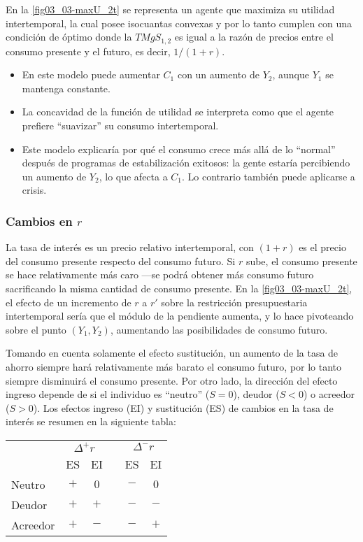 \documentclass[DeGregorioResumen]{subfiles}
\begin{document}
En la \autoref{fig03_03-maxU_2t} se representa un agente que maximiza su utilidad intertemporal, la cual posee isocuantas convexas y por lo tanto cumplen con una condición de óptimo donde la $TMgS_{1,2}$ es igual a la razón de precios entre el consumo presente y el futuro, es decir, $1/(1+r)$.

\begin{itemize}
\item En este modelo puede aumentar $C_1$ con un aumento de $Y_2$, aunque $Y_1$ se mantenga constante.
\item La concavidad de la función de utilidad se interpreta como que el agente prefiere ``suavizar'' su consumo intertemporal.
\item Este modelo explicaría por qué el consumo crece más allá de lo ``normal'' después de programas de estabilización exitosos: la gente estaría percibiendo un aumento de $Y_2$, lo que afecta a $C_1$. Lo contrario también puede aplicarse a crisis.
\end{itemize}



\subsubsection{Cambios en $r$}

La tasa de interés es un precio relativo intertemporal, con $(1+r)$ es el precio del consumo presente respecto del consumo futuro. Si $r$ sube, el consumo presente se hace relativamente más caro ---se podrá obtener más consumo futuro sacrificando la misma cantidad de consumo presente. En la \autoref{fig03_03-maxU_2t}, el efecto de un incremento de $r$ a $r'$ sobre la restricción presupuestaria intertemporal sería que el módulo de la pendiente aumenta, y lo hace pivoteando sobre el punto $(Y_1, Y_2)$, aumentando las posibilidades de consumo futuro.

Tomando en cuenta solamente el efecto sustitución, un aumento de la tasa de ahorro siempre hará relativamente más barato el consumo futuro, por lo tanto siempre disminuirá el consumo presente. Por otro lado, la dirección del efecto ingreso depende de si el individuo es ``neutro'' ($S=0$), deudor ($S<0$) o acreedor ($S>0$). Los efectos ingreso (EI) y sustitución (ES) de cambios en la tasa de interés se resumen en la siguiente tabla:

\begin{center}
\begin{tabular}{lccccc}
  \toprule
  & \multicolumn{2}{c}{$\Delta^+r $} & &\multicolumn{2}{c}{$\Delta^-r $} \\ \cmidrule{2-3} \cmidrule{5-6}
  & ES & EI && ES & EI \\
  \midrule
  Neutro & $+$ & $0$ && $-$ & $0$ \\
  Deudor & $+$ & $+$ && $-$ & $-$ \\
  Acreedor & $+$ & $-$ && $-$ & $+$ \\
  \bottomrule
\end{tabular}
\end{center}
\end{document}
